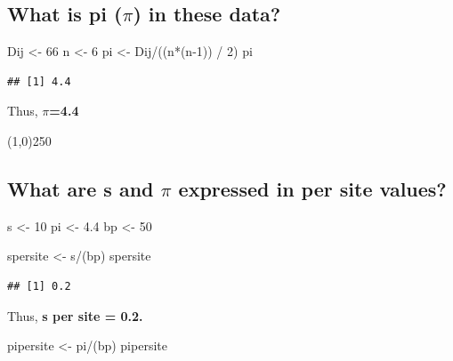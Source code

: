 \documentclass[]{article}
\newenvironment{Shaded}{\begin{snugshade}}{\end{snugshade}}
\newcommand{\DecValTok}[1]{\textcolor[rgb]{0.00,0.00,0.81}{{#1}}}
\newcommand{\FloatTok}[1]{\textcolor[rgb]{0.00,0.00,0.81}{{#1}}}
\newcommand{\StringTok}[1]{\textcolor[rgb]{0.31,0.60,0.02}{{#1}}}
\newcommand{\NormalTok}[1]{{#1}}
\begin{document}
\subsection{What is pi ($\pi$) in these
data?}\label{what-is-pi-pi-in-these-data}

\begin{Shaded}
\begin{Highlighting}[]
\NormalTok{Dij <-}\StringTok{ }\DecValTok{66}
\NormalTok{n <-}\StringTok{ }\DecValTok{6}
\NormalTok{pi <-}\StringTok{ }\NormalTok{Dij/((n*(n}\DecValTok{-1}\NormalTok{)) /}\StringTok{ }\DecValTok{2}\NormalTok{)}
\NormalTok{pi}
\end{Highlighting}
\end{Shaded}

\begin{verbatim}
## [1] 4.4
\end{verbatim}

Thus, \textbf{$\pi$=4.4}

\begin{center}
\line(1,0){250}
\end{center}

\subsection{What are s and $\pi$ expressed in per site
values?}\label{what-are-s-and-pi-expressed-in-per-site-values}

\begin{Shaded}
\begin{Highlighting}[]
\NormalTok{s <-}\StringTok{ }\DecValTok{10}
\NormalTok{pi <-}\StringTok{ }\FloatTok{4.4}
\NormalTok{bp <-}\StringTok{ }\DecValTok{50}

\NormalTok{spersite <-}\StringTok{ }\NormalTok{s/(bp)}
\NormalTok{spersite}
\end{Highlighting}
\end{Shaded}

\begin{verbatim}
## [1] 0.2
\end{verbatim}

Thus, \textbf{s per site = 0.2.}

\begin{Shaded}
\begin{Highlighting}[]
\NormalTok{pipersite <-}\StringTok{ }\NormalTok{pi/(bp)}
\NormalTok{pipersite}
\end{Highlighting}
\end{Shaded}
\end{document}

